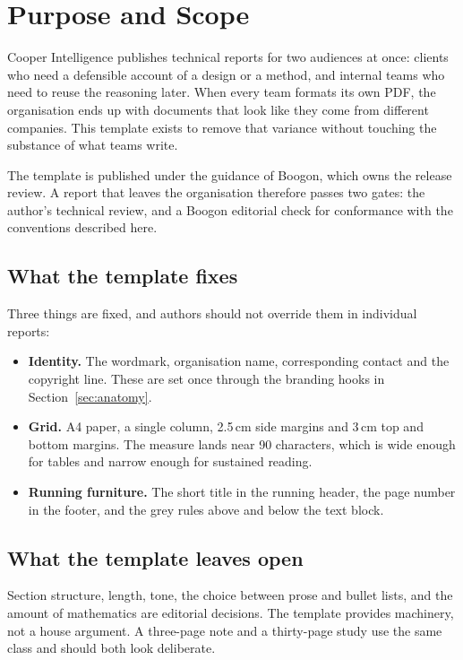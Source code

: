 \section{Purpose and Scope}
\label{sec:purpose}

Cooper Intelligence publishes technical reports for two audiences at once: clients who need a
defensible account of a design or a method, and internal teams who need to reuse the reasoning
later. When every team formats its own PDF, the organisation ends up with documents that look
like they come from different companies. This template exists to remove that variance without
touching the substance of what teams write.

The template is published under the guidance of Boogon, which owns the release review. A report
that leaves the organisation therefore passes two gates: the author's technical review, and a
Boogon editorial check for conformance with the conventions described here.

\subsection{What the template fixes}

Three things are fixed, and authors should not override them in individual reports:

\begin{itemize}
  \item \textbf{Identity.} The wordmark, organisation name, corresponding contact and the
        copyright line. These are set once through the branding hooks in
        Section~\ref{sec:anatomy}.
  \item \textbf{Grid.} A4 paper, a single column, 2.5\,cm side margins and 3\,cm top and bottom
        margins. The measure lands near 90 characters, which is wide enough for tables and
        narrow enough for sustained reading.
  \item \textbf{Running furniture.} The short title in the running header, the page number in
        the footer, and the grey rules above and below the text block.
\end{itemize}

\subsection{What the template leaves open}

Section structure, length, tone, the choice between prose and bullet lists, and the amount of
mathematics are editorial decisions. The template provides machinery, not a house argument.
A three-page note and a thirty-page study use the same class and should both look deliberate.

